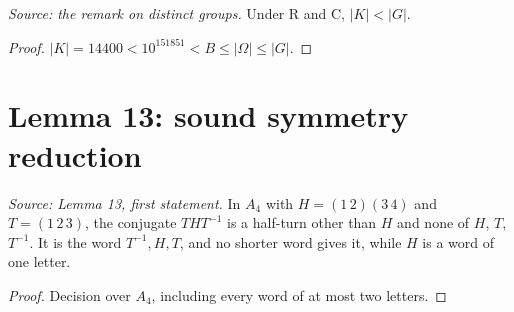 \begin{lemma}
  \label{lem:distinct-legal}
  \leanok
  \textit{Source: the remark on distinct groups.}
  Under R and C, \(|K|<|G|\).
\end{lemma}
\begin{proof}
  \leanok
  \(|K|=14400<10^{151851}<B\le|\Omega|\le|G|\).
\end{proof}

\section{Lemma 13: sound symmetry reduction}

\begin{lemma}
  \label{lem:tetrahedral-conjugation}
  \leanok
  \textit{Source: Lemma 13, first statement.}
  In \(A_4\) with \(H=(1\,2)(3\,4)\) and \(T=(1\,2\,3)\), the conjugate
  \(THT^{-1}\) is a half-turn other than \(H\) and none of \(H\), \(T\),
  \(T^{-1}\). It is the word \(T^{-1},H,T\), and no shorter word gives it,
  while \(H\) is a word of one letter.
\end{lemma}
\begin{proof}
  \leanok
  Decision over \(A_4\), including every word of at most two letters.
\end{proof}

